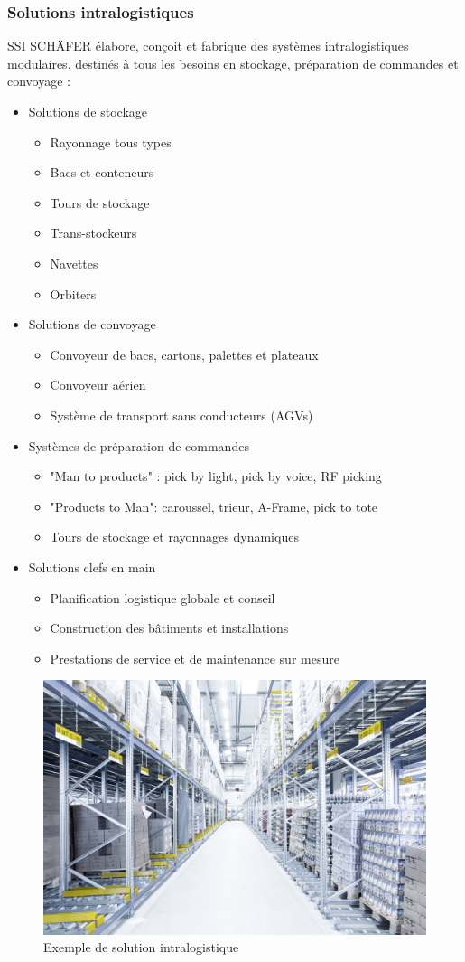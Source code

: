 \documentclass[a4paper, 12pt, french]{article}
\newcommand{\bdot}{\item[\color{ssiYellow}\ding{108}]}
\newcommand{\bdotoutlined}{\item[\color{ssiYellow}\ding{109}]}
\begin{document}
			\subsubsection{Solutions intralogistiques}
				SSI SCHÄFER élabore, conçoit et fabrique des systèmes intralogistiques modulaires, destinés à tous les besoins en stockage, préparation de commandes et convoyage :
				\begin{itemize}
					\bdot{Solutions de stockage}
						\begin{itemize}
							\bdotoutlined{Rayonnage tous types}
							\bdotoutlined{Bacs et conteneurs}
							\bdotoutlined{Tours de stockage}
							\bdotoutlined{Trans-stockeurs}
							\bdotoutlined{Navettes}
							\bdotoutlined{Orbiters}
						\end{itemize}
					\bdot{Solutions de convoyage}
						\begin{itemize}
							\bdotoutlined{Convoyeur de bacs, cartons, palettes et plateaux}
							\bdotoutlined{Convoyeur aérien}
							\bdotoutlined{Système de transport sans conducteurs (AGVs)}
						\end{itemize}
					\bdot{Systèmes de préparation de commandes}
						\begin{itemize}
							\bdotoutlined{"Man to products" : pick by light, pick by voice, RF picking}
							\bdotoutlined{"Products to Man": caroussel, trieur, A-Frame, pick to tote}
							\bdotoutlined{Tours de stockage et rayonnages dynamiques}
						\end{itemize}
					\bdot{Solutions clefs en main}
						\begin{itemize}
							\bdotoutlined{Planification logistique globale et conseil}
							\bdotoutlined{Construction des bâtiments et installations}
							\bdotoutlined{Prestations de service et de maintenance sur mesure}
						\end{itemize}
				\end{itemize}

			\begin{figure}[h!]
				\begin{center}
					\includegraphics[width=0.7\linewidth]{images/intralogistic.jpg}
				\end{center}
				\caption{Exemple de solution intralogistique}
				\label{fig:intralogistic}
			\end{figure}
	
\end{document}
